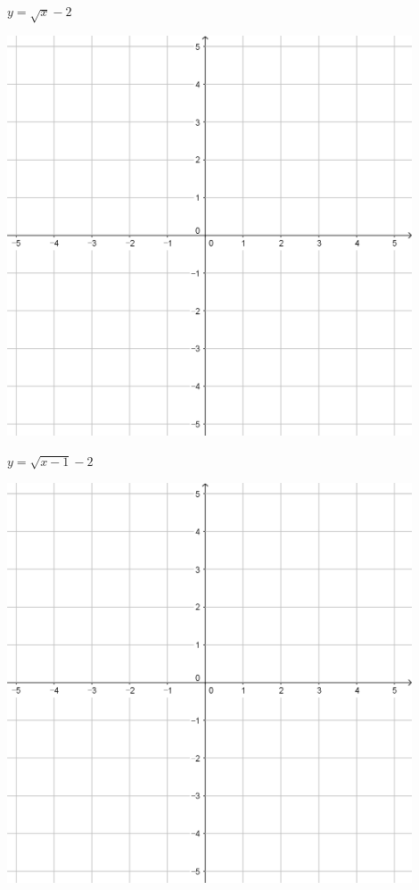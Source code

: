 \documentclass{oblivoir}
\begin{document}
\begin{minipage}{0.45\textwidth}\centering
\(y=\sqrt{x}-2\)
\par\bigskip\includegraphics[width=0.9\textwidth]{55}
\end{minipage}
\begin{minipage}{0.45\textwidth}\centering
\(y=\sqrt{x-1}-2\)
\par\bigskip\includegraphics[width=0.9\textwidth]{55}
\end{minipage}\bigskip\bigskip\par
\end{document}
